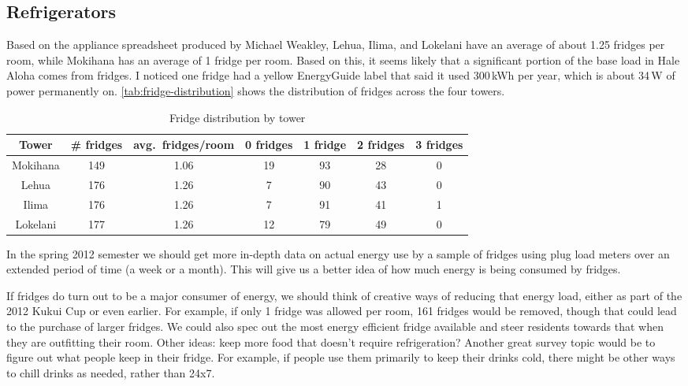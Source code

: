 \documentclass[11pt,draft]{article}
\newcommand{\W}{\,W\xspace}
\newcommand{\kWh}{\,kWh\xspace}
\begin{document}
\subsection{Refrigerators}

Based on the appliance spreadsheet produced by Michael Weakley, Lehua, Ilima, and Lokelani have an average of about 1.25 fridges per room, while Mokihana has an average of 1 fridge per room. Based on this, it seems likely that a significant portion of the base load in Hale Aloha comes from fridges. I noticed one fridge had a yellow EnergyGuide label that said it used 300\kWh per year, which is about 34\W of power permanently on. \autoref{tab:fridge-distribution} shows the distribution of fridges across the four towers.

\begin{table}[htbp]
	\centering
		\begin{tabular}{| c || c | c | c | c | c | c |}
			\hline
			Tower & \# fridges & avg.\ fridges/room & 0 fridges & 1 fridge & 2 fridges & 3 fridges \tabularnewline \hline \hline
			
			Mokihana & 149 & 1.06 & 19 & 93 & 28 & 0  \tabularnewline \hline
			
			Lehua & 176 & 1.26 & 7 & 90 & 43 & 0 \tabularnewline \hline
			
			Ilima & 176 & 1.26 & 7 & 91 & 41 & 1 \tabularnewline \hline

			Lokelani & 177 & 1.26 & 12 & 79 & 49 & 0 \tabularnewline \hline

		\end{tabular}
	\caption{Fridge distribution by tower}
\label{tab:fridge-distribution}
\end{table}

In the spring 2012 semester we should get more in-depth data on actual energy use by a sample of fridges using plug load meters over an extended period of time (a week or a month). This will give us a better idea of how much energy is being consumed by fridges.

If fridges do turn out to be a major consumer of energy, we should think of creative ways of reducing that energy load, either as part of the 2012 Kukui Cup or even earlier. For example, if only 1 fridge was allowed per room, 161 fridges would be removed, though that could lead to the purchase of larger fridges. We could also spec out the most energy efficient fridge available and steer residents towards that when they are outfitting their room. Other ideas: keep more food that doesn't require refrigeration? Another great survey topic would be to figure out what people keep in their fridge. For example, if people use them primarily to keep their drinks cold, there might be other ways to chill drinks as needed, rather than 24x7.
\end{document}
